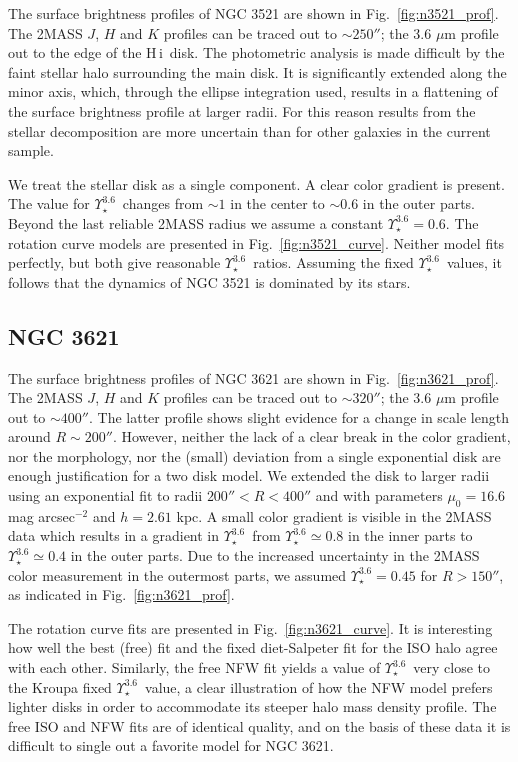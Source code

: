 \documentclass[usenatbib,usegraphicx,apjfonts,floatfix]{emulateapj}
\newcommand{\HI}{H\,{\sc i}}
\newcommand{\Ups}{\ensuremath{\Upsilon_{\star}^{3.6}}}
\begin{document}
The surface brightness profiles of NGC 3521 are shown in
Fig.~\ref{fig:n3521_prof}. The 2MASS $J$, $H$ and $K$ profiles can be
traced out to $\sim 250''$; the 3.6 $\mu$m profile out to the edge of
the \HI\ disk. The photometric analysis is made  difficult by
the faint stellar halo surrounding the main disk.  It is significantly
extended along the minor axis, which, through the ellipse integration
used, results in a flattening of the surface brightness profile at
larger radii.  For this reason results from the stellar decomposition
are more uncertain than for other galaxies in the current sample.

We treat the stellar disk as a single component. A clear color
gradient is present.  The value for \Ups\ changes from $\sim 1$ in the
center to $\sim 0.6$ in the outer parts. Beyond the last reliable
2MASS radius we assume a constant $\Ups=0.6$.  The rotation curve
models are presented in Fig.~\ref{fig:n3521_curve}.  Neither model
fits perfectly, but both give reasonable \Ups\ ratios. Assuming the
fixed \Ups\ values, it follows that the dynamics of NGC 3521 is dominated
by its stars.

\subsection{NGC 3621}

The surface brightness profiles of NGC 3621 are shown in
Fig.~\ref{fig:n3621_prof}. The 2MASS $J$, $H$ and $K$ profiles can be
traced out to $\sim 320''$; the 3.6 $\mu$m profile out to $\sim
400''$.  The latter profile shows slight evidence for a change in scale
length around $R\sim 200''$. However, neither the lack of a clear
break in the color gradient, nor the morphology, nor the (small)
deviation from a single exponential disk are enough justification for
a two disk model. We extended the disk to larger radii using an
exponential fit to radii $200''<R<400''$ and with parameters
$\mu_0 =16.6$ mag arcsec$^{-2}$ and $h=2.61$ kpc.  A small color
gradient is visible in the 2MASS data which results in a gradient in
\Ups\ from $\Ups \simeq 0.8$ in the inner parts to $\Ups \simeq 0.4$
in the outer parts. Due to the increased uncertainty in the 2MASS
color measurement in the outermost parts, we assumed $\Ups = 0.45$
for $R>150''$, as indicated in Fig.~\ref{fig:n3621_prof}.

The rotation curve fits are presented in Fig.~\ref{fig:n3621_curve}.
It is interesting how well the best (free) fit and the fixed
diet-Salpeter fit for the ISO halo agree with each other. Similarly,
the free NFW fit yields a value of \Ups\ very close to the Kroupa
fixed \Ups\ value, a clear illustration of how the NFW model prefers
lighter disks in order to accommodate its steeper halo mass density
profile.  The free ISO and NFW fits are of identical quality, and on
the basis of these data it is difficult to single out a favorite model
for NGC 3621.
\end{document}
